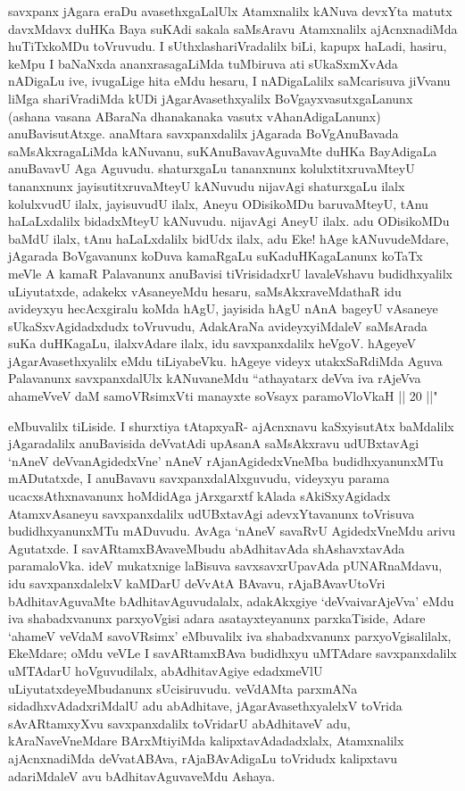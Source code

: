 \begin{artha}
savxpanx jAgara eraDu avasethxgaLalUlx Atamxnalilx kANuva devxYta matutx davxMdavx duHKa Baya suKAdi sakala saMsAravu Atamxnalilx ajAcnxnadiMda huTiTxkoMDu toVruvudu. I sUthxlashariVradalilx biLi, kapupx haLadi, hasiru, keMpu I baNaNxda ananxrasagaLiMda tuMbiruva ati sUkaSxmXvAda nADigaLu ive, ivugaLige hita eMdu hesaru, I nADigaLalilx saMcarisuva jiVvanu liMga shariVradiMda kUDi jAgarAvasethxyalilx BoVgayxvasutxgaLanunx (ashana vasana ABaraNa dhanakanaka vasutx vAhanAdigaLanunx) anuBavisutAtxge. anaMtara savxpanxdalilx jAgarada BoVgAnuBavada saMsAkxragaLiMda kANuvanu, suKAnuBavavAguvaMte duHKa BayAdigaLa anuBavavU Aga Aguvudu. shaturxgaLu tananxnunx kolulxtitxruvaMteyU tananxnunx jayisutitxruvaMteyU kANuvudu nijavAgi shaturxgaLu ilalx kolulxvudU ilalx, jayisuvudU ilalx, Aneyu ODisikoMDu baruvaMteyU, tAnu haLaLxdalilx bidadxMteyU kANuvudu. nijavAgi AneyU ilalx. adu ODisikoMDu baMdU ilalx, tAnu haLaLxdalilx bidUdx ilalx, adu Eke! hAge kANuvudeMdare, jAgarada BoVgavanunx koDuva kamaRgaLu suKaduHKagaLanunx koTaTx meVle A kamaR Palavanunx anuBavisi tiVrisidadxrU lavaleVshavu budidhxyalilx uLiyutatxde, adakekx vAsaneyeMdu hesaru, saMsAkxraveMdathaR idu avideyxyu hecAcxgiralu koMda hAgU, jayisida hAgU nAnA bageyU vAsaneye sUkaSxvAgidadxdudx toVruvudu, AdakAraNa avideyxyiMdaleV saMsArada suKa duHKagaLu, ilalxvAdare ilalx, idu savxpanxdalilx heVgoV. hAgeyeV jAgarAvasethxyalilx eMdu tiLiyabeVku. hAgeye videyx utakxSaRdiMda Aguva Palavanunx savxpanxdalUlx kANuvaneMdu ``athayatarx deVva iva rAjeVva ahameVveV daM samoVR\s simxVti manayxte soV\s sayx paramoVloVkaH || 20 ||" 
\end{artha}%

\begin{artha}
eMbuvalilx tiLiside. I shurxtiya tAtapxyaR- ajAcnxnavu kaSxyisutAtx baMdalilx jAgaradalilx anuBavisida deVvatAdi upAsanA saMsAkxravu udUBxtavAgi `nAneV deVvanAgidedxVne' nAneV rAjanAgidedxVneMba budidhxyanunxMTu mADutatxde, I anuBavavu savxpanxdalAlxguvudu, videyxyu parama ucacxsAthxnavanunx hoMdidAga jArxgarxtf kAlada sAkiSxyAgidadx AtamxvAsaneyu savxpanxdalilx udUBxtavAgi adevxYtavanunx toVrisuva budidhxyanunxMTu mADuvudu. AvAga `nAneV savaRvU AgidedxVneMdu arivu Agutatxde. I savARtamxBAvaveMbudu abAdhitavAda shAshavxtavAda paramaloVka. ideV mukatxnige laBisuva savxsavxrUpavAda pUNARnaMdavu, idu savxpanxdalelxV kaMDarU deVvAtA BAvavu, rAjaBAvavUtoVri bAdhitavAguvaMte bAdhitavAguvudalalx, adakAkxgiye `deVvaivarAjeVva' eMdu iva shabadxvanunx parxyoVgisi adara asatayxteyanunx parxkaTiside, Adare `ahameV veVdaM savoVRsimx' eMbuvalilx iva shabadxvanunx parxyoVgisalilalx, EkeMdare; oMdu veVLe I savARtamxBAva budidhxyu uMTAdare savxpanxdalilx uMTAdarU hoVguvudilalx, abAdhitavAgiye edadxmeVlU uLiyutatxdeyeMbudanunx sUcisiruvudu. veVdAMta parxmANa sidadhxvAdadxriMdalU adu abAdhitave, jAgarAvasethxyalelxV toVrida sAvARtamxyXvu savxpanxdalilx toVridarU abAdhitaveV adu, kAraNaveVneMdare BArxMtiyiMda kalipxtavAdadadxlalx, Atamxnalilx ajAcnxnadiMda deVvatABAva, rAjaBAvAdigaLu toVridudx kalipxtavu adariMdaleV avu bAdhitavAguvaveMdu Ashaya. 
\end{artha}


